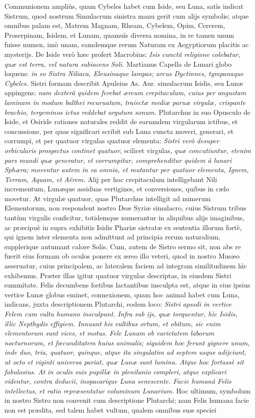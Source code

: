 \documentclass[a4paper, 11pt, oneside, polutonikogreek, latin]{article}
\begin{document}
Communionem ampliùs, quam Cybeles habet cum Iside, seu Luna, satìs indicat Sistrum, quod nostrum Simulacrum sinistra manu gerit cum alijs symbolis; atque omnibus palam est, Matrem Magnam, Rheam, Cybelem, Opim, Cererem, Proserpinam, Isidem, et Lunam, quamuìs diversa nomina, in re tamen unum fuisse numen, imò unam, eamdemque rerum Naturam ex Aegyptiorum placitis ac mysterijs. De Iside verò hæc profert Macrobius: \emph{Isis cunctâ religione colebatur, quæ est terra, vel natura subiacens Soli.} Martianus Capella de Lunari globo loquens: \emph{in eo Sistra Niliaca, Eleusinaque lampas; arcus Dyctinnes, tympanaque Cybeles.} Sistri formam describit Apuleius As. Aur. simulacrum Isidis, seu Lunæ appingens: \emph{nam dexterâ quidem ferebat æreum crepitaculum, cuius per angustam laminam in modum balthei recuruatam, traiectæ mediæ paruæ virgulæ, crispante brachio, tergeminos ictus reddebat argutum sonum.} Plutarchus in suo Opusculo de Iside, et Osiride rationes naturales reddit de earumdem virgularum ictibus, et concussione, per quas significari scribit sub Luna cuncta moveri, generari, et corrumpi, et per quatuor virgulas quatuor elementa: \emph{Sistri verò desuper orbicularis prospectus continet quatuor}, scilicet virgulas, \emph{quæ concutiuntur, etenim pars mundi quæ generatur, et corrumpitur, comprehenditur quidem à lunari Sphæra; moventur autem in ea omnia, et mutantur per quatuor elementa, Ignem, Terram, Aquam, et Aërem.} Alij per hoc crepitaculum intelligebant Nili incrementum, Lunæque assiduas vertigines, et conversiones, quibus in cælo movetur. At virgulæ quatuor, quas Plutarchus intelligit ad numerum Elementorum, non respondent nostro Deæ Syriæ simulacro, cuius Sistrum tribus tantùm virgulis conficitur, totidemque numerantur in aliquibus alijs imaginibus, ac præcipuè in supra exhibitis Isidis Phariæ sistratæ ex sententia illorum fortè, qui ignem inter elementa non admittunt ad principia rerum naturalium, supplerique autumant calore Solis. Cum, autem de Sistro sermo sit, non abs re fuerit eius formam ob oculos ponere ex æreo illo veteri, quod in nostro Musæo asseruatur, cuius principalem, ac lateralem faciem ad integram similitudinem hìc exhibemus. Præter illas igitur quatuor virgulas descriptas, in eiusdem Sistri summitate. Felis decumbens fœtibus lactantibus insculpta est, atque in eius ipsius vertice Lunæ globus eminet, connexionem, quam hoc animal habet cum Luna, indicans, juxta descriptionem Plutarchi, eodem loco: \emph{Sistri apssdi in vertice Felem cum vultu humano insculpunt. Infra sub ijs, quæ torquentur, hìc Isidis, illic Nepthydis effigiem. Innuunt his vultibus ortum, et obitum, sic enim elementorum sunt vices, et motus. Fele Lunam ob varietatem laborum nocturnorum, et fœcunditatem huius animalis; siquidem hoc ferunt gignere unum, inde duo, tria, quatuor, quinque, atque ita singulatim ad septem usque adijciunt, ut octo et viginti universa pariat, quæ Lunæ sunt lumina. Atque hoc fortassè sit fabulosius. At in oculis suis pupillæ in plenilunio compleri, atque explicari videntur, contra deducii, inopacarique Luna senescente. Facie humanâ Felis intellectus, et ratio repræsentatur voluminum Lunarium.} Hoc ultimum, symbolum in nostro Sistro non convenit cum descriptione Plutarchi; nam Felis humana facie non est prædita, sed talem habet vultum, qualem omnibus suæ speciei 
\end{document}
